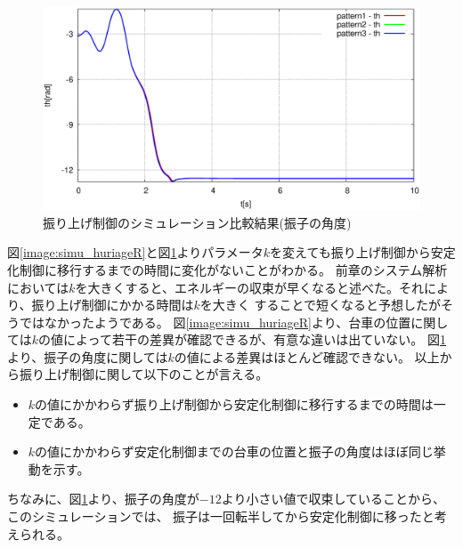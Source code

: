 	\begin{figure}[H]
		\centering
		\includegraphics[width=0.8\linewidth]{gazo/Hsimu_TH.eps}
		\caption{振り上げ制御のシミュレーション比較結果(振子の角度)}
		\label{image:simu_huriageTH}
	\end{figure}
	図\ref{image:simu_huriageR}と図\ref{image:simu_huriageTH}よりパラメータ$k$を変えても振り上げ制御から安定化制御に移行するまでの時間に変化がないことがわかる。
	前章のシステム解析においては$k$を大きくすると、エネルギーの収束が早くなると述べた。それにより、振り上げ制御にかかる時間は$k$を大きく
	することで短くなると予想したがそうではなかったようである。
	図\ref{image:simu_huriageR}より、台車の位置に関しては$k$の値によって若干の差異が確認できるが、有意な違いは出ていない。
	図\ref{image:simu_huriageTH}より、振子の角度に関しては$k$の値による差異はほとんど確認できない。
	以上から振り上げ制御に関して以下のことが言える。
	\begin{itemize}
	  \item $k$の値にかかわらず振り上げ制御から安定化制御に移行するまでの時間は一定である。
	  \item $k$の値にかかわらず安定化制御までの台車の位置と振子の角度はほぼ同じ挙動を示す。
	\end{itemize}
	ちなみに、図\ref{image:simu_huriageTH}より、振子の角度が$-12$より小さい値で収束していることから、このシミュレーションでは、
	振子は一回転半してから安定化制御に移ったと考えられる。
	
	
	
